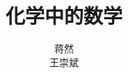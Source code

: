 \documentclass[12pt]{book}
\begin{document}
    \title{\heiti 化学中的数学}
    \author{\kaishu 蒋然 \\ \kaishu 王崇斌}
    \maketitle
    \tableofcontents
    \mainmatter
 
    
    
    
    
    
    
    
    
    
    
\end{document}
